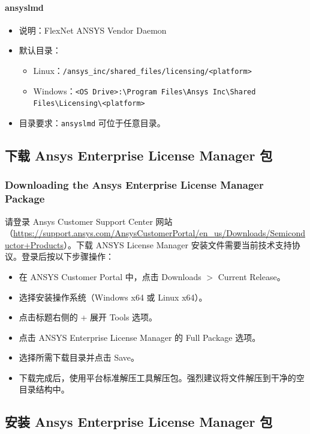 \paragraph{ansyslmd}
\begin{itemize}
  \item 说明：FlexNet ANSYS Vendor Daemon
  \item 默认目录：
  \begin{itemize}
    \item Linux：\texttt{/ansys\_inc/shared\_files/licensing/<platform>}
    \item Windows：\texttt{<OS Drive>:\textbackslash Program Files\textbackslash Ansys Inc\textbackslash Shared Files\textbackslash Licensing\textbackslash <platform>}
  \end{itemize}
  \item 目录要求：\texttt{ansyslmd} 可位于任意目录。
\end{itemize}

\subsection{下载 Ansys Enterprise License Manager 包}
\subsubsection*{Downloading the Ansys Enterprise License Manager Package}

请登录 Ansys Customer Support Center 网站（\url{https://support.ansys.com/AnsysCustomerPortal/en\_us/Downloads/Semiconductor+Products}）。下载 ANSYS License Manager 安装文件需要当前技术支持协议。登录后按以下步骤操作：
\begin{itemize}
  \item 在 ANSYS Customer Portal 中，点击 Downloads $>$ Current Release。
  \item 选择安装操作系统（Windows x64 或 Linux x64）。
  \item 点击标题右侧的 + 展开 Tools 选项。
  \item 点击 ANSYS Enterprise License Manager 的 Full Package 选项。
  \item 选择所需下载目录并点击 Save。
  \item 下载完成后，使用平台标准解压工具解压包。强烈建议将文件解压到干净的空目录结构中。
\end{itemize}

\subsection{安装 Ansys Enterprise License Manager 包}
